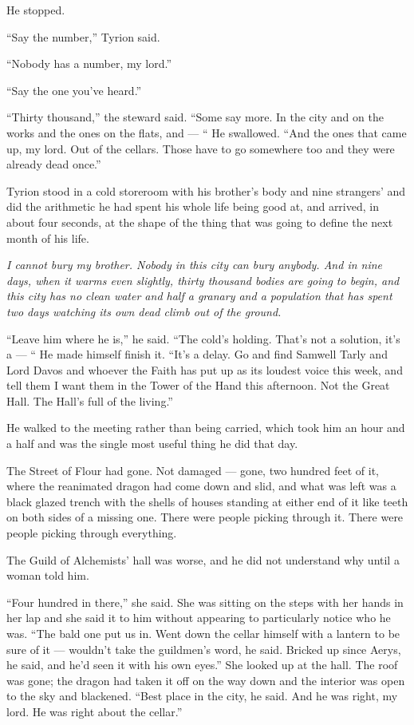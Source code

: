 He stopped.

“Say the number,” Tyrion said.

“Nobody has a number, my lord.”

“Say the one you’ve heard.”

“Thirty thousand,” the steward said. “Some say more. In the city and on the works and the ones on the flats, and — “ He swallowed. “And the ones that came up, my lord. Out of the cellars. Those have to go somewhere too and they were already dead once.”

Tyrion stood in a cold storeroom with his brother’s body and nine strangers’ and did the arithmetic he had spent his whole life being good at, and arrived, in about four seconds, at the shape of the thing that was going to define the next month of his life.

\textit{I cannot bury my brother. Nobody in this city can bury anybody. And in nine days, when it warms even slightly, thirty thousand bodies are going to begin, and this city has no clean water and half a granary and a population that has spent two days watching its own dead climb out of the ground.}

“Leave him where he is,” he said. “The cold’s holding. That’s not a solution, it’s a — “ He made himself finish it. “It’s a delay. Go and find Samwell Tarly and Lord Davos and whoever the Faith has put up as its loudest voice this week, and tell them I want them in the Tower of the Hand this afternoon. Not the Great Hall. The Hall’s full of the living.”

\sceneBreak

He walked to the meeting rather than being carried, which took him an hour and a half and was the single most useful thing he did that day.

The Street of Flour had gone. Not damaged — gone, two hundred feet of it, where the reanimated dragon had come down and slid, and what was left was a black glazed trench with the shells of houses standing at either end of it like teeth on both sides of a missing one. There were people picking through it. There were people picking through everything.

The Guild of Alchemists’ hall was worse, and he did not understand why until a woman told him.

“Four hundred in there,” she said. She was sitting on the steps with her hands in her lap and she said it to him without appearing to particularly notice who he was. “The bald one put us in. Went down the cellar himself with a lantern to be sure of it — wouldn’t take the guildmen’s word, he said. Bricked up since Aerys, he said, and he’d seen it with his own eyes.” She looked up at the hall. The roof was gone; the dragon had taken it off on the way down and the interior was open to the sky and blackened. “Best place in the city, he said. And he was right, my lord. He was right about the cellar.”

